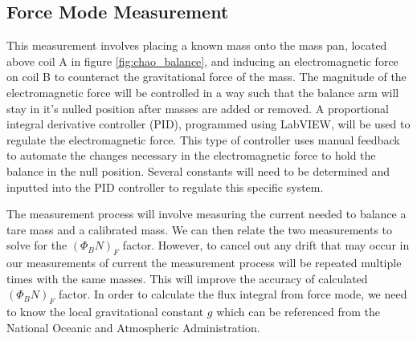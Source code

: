 \documentclass[aps,prstab,reprint,12pt]{revtex4-1}
\begin{document}

\subsection{Force Mode Measurement}

This measurement involves placing a known mass onto the mass pan, located above coil A in figure \ref{fig:chao_balance}, and inducing an electromagnetic force on coil B to counteract the gravitational force of the mass. The magnitude of the electromagnetic force will be controlled in a way such that the balance arm will stay in it's nulled position after masses are added or removed. A proportional integral derivative controller (PID), programmed using LabVIEW, will be used to regulate the electromagnetic force. This type of controller uses manual feedback to automate the changes necessary in the
electromagnetic force to hold the balance in the null position. Several constants will need to be determined and inputted into the PID controller to regulate this specific system.

The measurement process will involve measuring the current needed to balance a tare mass and a calibrated mass. We can then relate the two measurements to solve for the $(\Phi_B N)_F$ factor. However, to cancel out any drift that may occur in our measurements of current the measurement process will be repeated multiple times with the same masses. This will improve the accuracy of calculated $(\Phi_B N)_F$ factor. In order to calculate the flux integral from force mode, we need to know the local gravitational constant $g$ which can be referenced from the National Oceanic and Atmospheric Administration.

\end{document}
